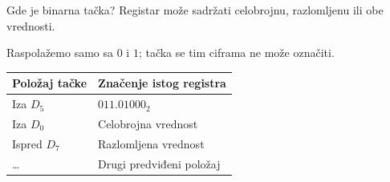 \begin{frame}[label=04-s026]{Gde je binarna tačka?}
Registar može sadržati celobrojnu, razlomljenu ili obe vrednosti.
\par\vspace{1.5mm}{\fontsize{10}{12}\selectfont\renewcommand{\arraystretch}{.95}\par}\par\vspace{1.5mm}
Raspolažemo samo sa $0$ i $1$; tačka se tim ciframa ne može označiti.
\par\vspace{1.5mm}
{\fontsize{10}{12}\selectfont\renewcommand{\arraystretch}{.95}\begin{tabularx}{\linewidth}{@{}lX@{}}\toprule
Položaj tačke & Značenje istog registra\\\midrule
Iza $D_5$ & $011.01000_2$\\
Iza $D_0$ & Celobrojna vrednost\\
Ispred $D_7$ & Razlomljena vrednost\\
\ldots & Drugi predviđeni položaj\\\bottomrule
\end{tabularx}\par}
\end{frame}

